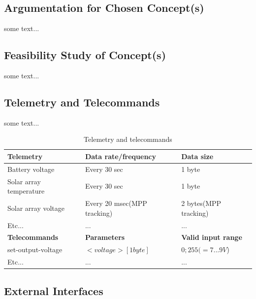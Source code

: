 \subsection{Argumentation for Chosen Concept(s)}


some text...

\subsection{Feasibility Study of Concept(s)}

some text...

\subsection{Telemetry and Telecommands}

some text...

\begin{table}[h]
\centering
\begin{tabular}{|l|l|l|}
\hline
\textbf{Telemetry} & \textbf{Data rate/frequency} & \textbf{Data size} \\
\hline
Battery voltage & Every 30 sec & 1 byte \\
\hline
Solar array temperature & Every 30 sec & 1 byte\\
\hline
Solar array voltage & Every 20 msec(MPP tracking) & 2 bytes(MPP tracking)\\
\hline
Etc... & ... & ... \\
\hline
\hline
\textbf{Telecommands} & \textbf{Parameters} & \textbf{Valid input range}\\
set-output-voltage & $<voltage>[1 byte]$ & $0;255 (=7...9V$)\\
\hline
Etc... & ... & ...\\
\hline
\end{tabular}
\caption{Telemetry and telecommands}
\label{tab:Telemetry_Telecommands}
\end{table}

\subsection{External Interfaces}

